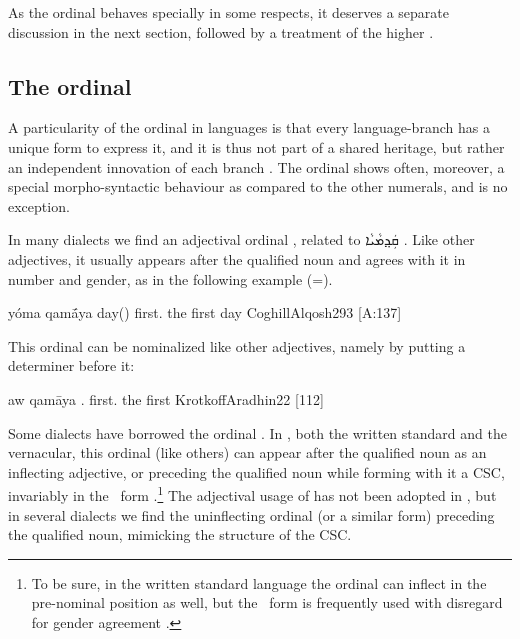 As the ordinal  behaves specially in some respects, it deserves a separate discussion in the next section, followed by a treatment of the higher . 

\subsection{The ordinal }

A particularity of the ordinal  in  languages is that every  language-branch has a unique form to express it, and it is thus not part of a shared  heritage, but rather an independent innovation of each branch \citep{LoewenstammFirst}. The ordinal  shows often, moreover, a special morpho-syntactic behaviour as compared to the other numerals, and  is no exception. 

In many  dialects we find an adjectival ordinal , related to
 \Syr \textsyriac{ܩܲܕ݂ܡܵܝܵܐ} . Like other adjectives, it usually appears after the qualified noun and agrees with it in number and gender, as in the following example (=).

{yóma qamā́ya}
{day(\masc) first.\masc}
{the first day}
{CoghillAlqosh}{293 {[A:137]}}

This ordinal can be nominalized like other adjectives, namely by putting a determiner before it:

{aw qamāya}
{.\masc{} first.\masc{}}
{the first}
{KrotkoffAradhin}{22 {[112]}}

Some dialects have borrowed the \Arab ordinal . 
In , both the written standard and the \Iraq vernacular, this ordinal (like others) can appear after the qualified noun as an inflecting adjective, or preceding the qualified noun while forming with it a CSC, invariably in the \masc\ form \parencites[224]{SchulzArabic}[366f.]{ErwinIraqi}.\footnote{To be sure, in the written standard language the ordinal  can inflect in the pre-nominal position as well, but the \masc\ form is frequently used with disregard for gender agreement \citep[271]{BadawiCarter}.}
The adjectival usage of  has not been adopted in , but in several  dialects we find the uninflecting ordinal  (or a similar form) preceding the qualified noun, mimicking the structure of the  CSC. 

